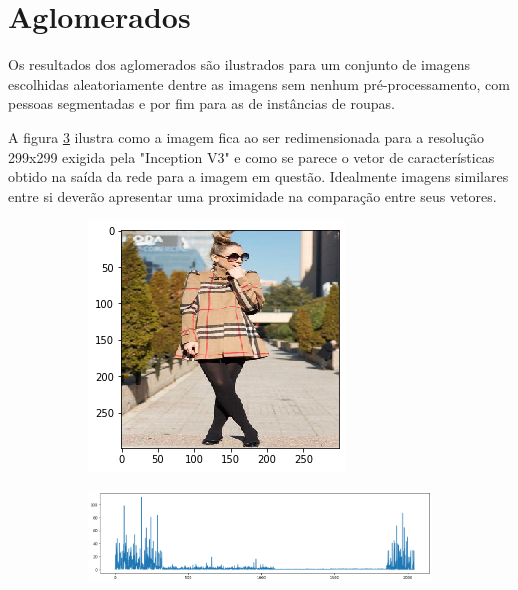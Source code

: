 \documentclass[12pt]{report}
\begin{document}
\section{Aglomerados}


Os resultados dos aglomerados são ilustrados para um conjunto de imagens escolhidas aleatoriamente dentre as imagens sem nenhum pré-processamento, com pessoas segmentadas e por fim para as de instâncias de roupas. 

A figura \ref{fig:originais} ilustra como a imagem fica ao ser redimensionada para a resolução 299x299 exigida pela "Inception V3" e como se parece o vetor de características obtido na saída da rede para a imagem em questão. Idealmente imagens similares entre si deverão apresentar uma proximidade na comparação entre seus vetores. 

\begin{figure}
  \centering
  \begin{subfigure}[b]{\textwidth}
  \centering
    \includegraphics[scale=0.7]{images/resultados/299206menor.png}
    \label{fig:}
  \end{subfigure}
  \centering
  \begin{subfigure}[b]{\textwidth}
  \centering
    \includegraphics[scale=0.45]{images/resultados/299206feat.png}
    \label{fig:}
  \end{subfigure}
  \label{fig:originais}
\end{figure}
\end{document}
